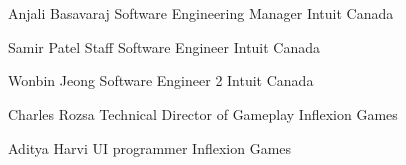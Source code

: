 \section*{}
\begin{tabitemize}
    \item Anjali Basavaraj \cdot Software Engineering Manager \cdot Intuit Canada \cdot
    \item Samir Patel \cdot Staff Software Engineer \cdot Intuit Canada \cdot
    \item Wonbin Jeong \cdot Software Engineer 2 \cdot Intuit Canada \cdot
    \item Charles Rozsa \cdot Technical Director of Gameplay \cdot Inflexion Games \cdot
    \item Aditya Harvi \cdot UI programmer \cdot Inflexion Games \cdot
\end{tabitemize}

